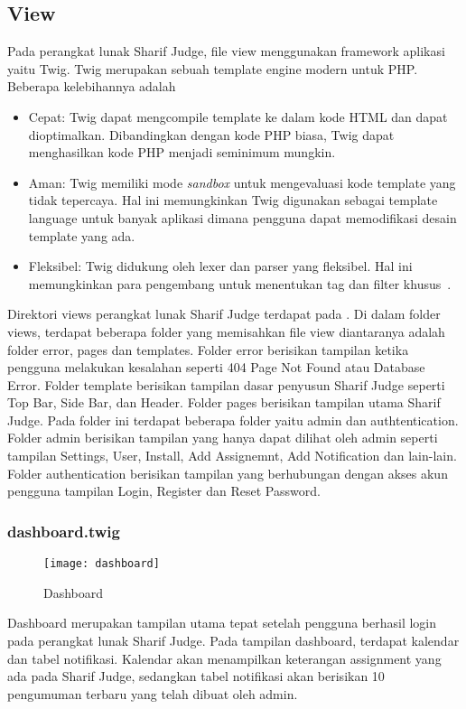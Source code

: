 \subsection{View}
Pada perangkat lunak Sharif Judge, file view menggunakan framework aplikasi yaitu Twig. Twig merupakan sebuah template engine modern untuk PHP. Beberapa kelebihannya adalah
\begin{itemize}
	\item Cepat: Twig dapat mengcompile template ke dalam kode HTML dan dapat dioptimalkan. Dibandingkan dengan kode PHP biasa, Twig dapat menghasilkan kode PHP menjadi seminimum mungkin.
	\item Aman: Twig memiliki mode \textit{sandbox} untuk mengevaluasi kode template yang tidak tepercaya. Hal ini memungkinkan Twig digunakan sebagai template language untuk banyak aplikasi dimana pengguna dapat memodifikasi desain template yang ada.
	\item Fleksibel: Twig didukung oleh lexer dan parser yang fleksibel. Hal ini memungkinkan para pengembang untuk menentukan tag dan filter khusus~\cite{fabien:09:twig}.
\end{itemize}

Direktori views perangkat lunak Sharif Judge terdapat pada . Di dalam folder views, terdapat beberapa folder yang memisahkan file view diantaranya adalah folder error, pages dan templates. Folder error berisikan tampilan ketika pengguna melakukan kesalahan seperti 404 Page Not Found atau Database Error. Folder template berisikan tampilan dasar penyusun Sharif Judge seperti Top Bar, Side Bar, dan Header. Folder pages berisikan tampilan utama Sharif Judge. Pada folder ini terdapat beberapa folder yaitu admin dan authtentication. Folder admin berisikan tampilan yang hanya dapat dilihat oleh admin seperti tampilan Settings, User, Install, Add Assignemnt, Add Notification dan lain-lain. Folder authentication berisikan tampilan yang berhubungan dengan akses akun pengguna tampilan Login, Register dan Reset Password.

\subsubsection{dashboard.twig}
\begin{figure}[H]
	\centering  
	\texttt{[image: dashboard]}  
	\caption[Dashboard]{Dashboard} 
	\label{fig:dashboard} 
\end{figure} 
Dashboard merupakan tampilan utama tepat setelah pengguna berhasil login pada perangkat lunak Sharif Judge. Pada tampilan dashboard, terdapat kalendar dan tabel notifikasi. Kalendar akan menampilkan keterangan assignment yang ada pada Sharif Judge, sedangkan tabel notifikasi akan berisikan 10 pengumuman terbaru yang telah dibuat oleh admin.

